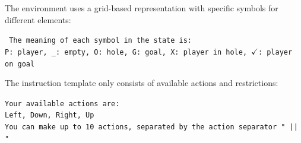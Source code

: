 

The environment uses a grid-based representation with specific symbols for different elements:

\begin{tcolorbox}[colback=gray!2, colframe=black, boxrule=0.5pt, arc=2pt, width=0.95\linewidth, title=Grid Representation]
\texttt{
The meaning of each symbol in the state is:\\
P: player, \_: empty, O: hole, G: goal, X: player in hole, $\checkmark$: player on goal
}
\end{tcolorbox}

The instruction template only consists of available actions and restrictions:

\begin{tcolorbox}[colback=gray!2, colframe=black, boxrule=0.5pt, arc=2pt, width=0.95\linewidth, title=Instruction Template]
\texttt{Your available actions are:\\
Left, Down, Right, Up\\
You can make up to 10 actions, separated by the action separator " || "
}
\end{tcolorbox}


